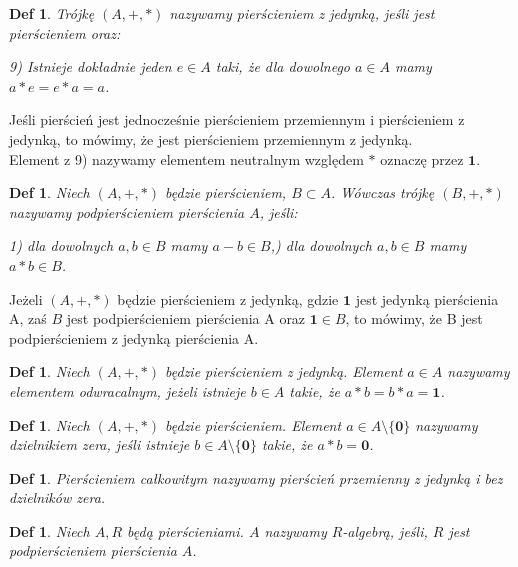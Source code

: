 \documentclass[12pt,a4paper]{article}
\newtheorem{definition}[twr]{Def}
\numberwithin{equation}{section}
\begin{document}
\begin{definition} \normalfont
 Trójkę $(A,+,*)$ nazywamy pierścieniem z jedynką, jeśli jest pierścieniem oraz:
    \begin{flushleft}
  9)\: Istnieje dokładnie jeden $e \in A$ taki, że dla dowolnego $a \in A$ mamy $a*e=e*a=a$.
    \end{flushleft}
\end{definition}

Jeśli pierścień jest jednocześnie pierścieniem przemiennym i pierścieniem z jedynką, to mówimy, że jest pierścieniem przemiennym z jedynką. 
\\Element z 9) nazywamy elementem neutralnym względem $*$ oznaczę przez $\textbf{1}$.



\begin{definition} \normalfont
 Niech $(A,+,*)$ będzie pierścieniem, $B \subset A$. Wówczas trójkę  $(B,+,*)$ nazywamy podpierścieniem pierścienia $A$, jeśli:
    \begin{flushleft}
1)\: dla dowolnych $a,b \in B$ mamy $a-b \in B$,)\: dla dowolnych $a,b \in B$ mamy $a*b \in B$.
    \end{flushleft}
\end{definition}

Jeżeli $(A,+,*)$ będzie pierścieniem z jedynką, gdzie $\textbf{1}$ jest jedynką pierścienia A, zaś $B$ jest podpierścieniem pierścienia A oraz $\textbf{1} \in B$, to mówimy, że B jest podpierścieniem z jedynką pierścienia A.


\begin{definition} \normalfont
 Niech $(A,+,*)$ będzie pierścieniem z jedynką. Element $a \in A$ nazywamy elementem odwracalnym, jeżeli istnieje $b \in A$ takie, że $a*b=b*a=\textbf{1}$.
\end{definition}

\begin{definition} \normalfont
Niech $(A,+,*)$ będzie pierścieniem. Element $a \in A \setminus \{ \textbf{0}\}$ nazywamy dzielnikiem zera, jeśli istnieje $b \in A \setminus \{ \textbf{0} \}$ takie, że $a*b=\textbf{0}$.
\end{definition}

\begin{definition} \normalfont
Pierścieniem całkowitym nazywamy pierścień przemienny z jedynką i bez dzielników zera.
\end{definition}


\begin{definition} \normalfont
Niech $A,R$ będą pierścieniami. $A$ nazywamy $R$-algebrą, jeśli, $R$ jest podpierścieniem pierścienia $A$.
\end{definition}
\end{document}
